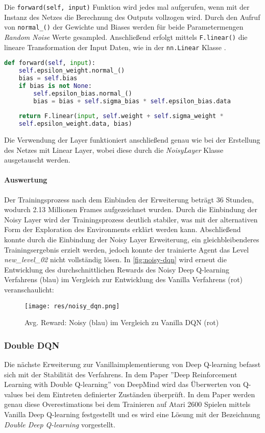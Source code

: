 \documentclass[11pt]{scrartcl}
\begin{document}
Die \lstinline!forward(self, input)! Funktion wird jedes mal aufgerufen, wenn mit der Instanz
des Netzes die Berechnung des Outputs vollzogen wird. Durch den Aufruf von 
\lstinline!normal_()! der Gewichte und Biases werden für beide Parametermengen 
\textit{Random Noise} Werte gesampled. Anschließend erfolgt mittels \lstinline!F.linear()!
die lineare Transformation der Input Daten, wie in der \lstinline!nn.Linear! Klasse 
\cite[~S.179 ff.]{L2018}.

\begin{lstlisting}[language=Python, caption=\textit{forward()} Funktion Noisy Layer, 
label=lst:noisy_forward]
	def forward(self, input):
	self.epsilon_weight.normal_()
	bias = self.bias
	if bias is not None:
	    self.epsilon_bias.normal_()
	    bias = bias + self.sigma_bias * self.epsilon_bias.data
		
	return F.linear(input, self.weight + self.sigma_weight *
	self.epsilon_weight.data, bias)
\end{lstlisting}

Die Verwendung der Layer funktioniert anschließend genau wie bei der Erstellung des Netzes mit
Linear Layer, wobei diese durch die \textit{NoisyLayer} Klasse ausgetauscht werden.

\paragraph*{Auswertung}
\noindent
\newline
Der Trainingsprozess nach dem Einbinden der Erweiterung beträgt 36 Stunden, wodurch 2.13 Millionen
Frames aufgezeichnet wurden. Durch die Einbindung der Noisy Layer wird der Trainingsprozess
deutlich stabiler, was mit der alternativen Form der Exploration des Environments erklärt werden
kann. Abschließend konnte durch die Einbindung der Noisy Layer Erweiterung, ein
gleichbleibenderes Trainingsergebnis erzielt werden, jedoch konnte der trainierte Agent
das Level \textit{new\_level\_02} nicht vollständig lösen. In \autoref{fig:noisy-dqn}
wird erneut die Entwicklung des durchschnittlichen Rewards des Noisy Deep Q-learning
Verfahrens (blau) im Vergleich zur Entwicklung des Vanilla Verfahrens (rot) veranschaulicht:

\begin{figure}[htp]
\centering
\texttt{[image: res/noisy\_dqn.png]}
\caption{Avg. Reward: Noisy (blau) im Vergleich zu Vanilla DQN (rot)}
\label{fig:noisy-dqn}
\end{figure}

\subsubsection{Double DQN}
Die nächste Erweiterung zur Vanillaimplementierung von Deep Q-learning befasst sich mit der
Stabilität des Verfahrens. In dem Paper ''Deep Reinforcement Learning with Double Q-learning''
von DeepMind\cite{HGD2015} wird das Überwerten von Q-values bei dem Eintreten definierter
Zuständen überprüft. In dem Paper werden genau diese Overestimations bei dem Trainieren auf
Atari 2600 Spielen mittels Vanilla Deep Q-learning festgestellt und es wird eine Lösung mit
der Bezeichnung \textit{Double Deep Q-learning} vorgestellt.
\end{document}
